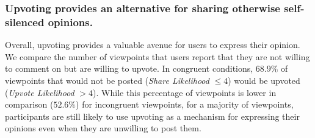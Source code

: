 \subsubsection{Upvoting provides an alternative for sharing otherwise self-silenced opinions.} Overall, upvoting provides a valuable avenue for users to express their opinion. We compare the number of viewpoints that users report that they are not willing to comment on but are willing to upvote. In congruent conditions, $68.9\%$ of viewpoints that would not be posted (\textit{Share Likelihood} $ \leq 4$) would be upvoted (\textit{Upvote Likelihood} $ > 4$). While this percentage of viewpoints is lower in comparison ($52.6\%$) for incongruent viewpoints, for a majority of viewpoints, participants are still likely to use upvoting as a mechanism for expressing their opinions even when they are unwilling to post them. 
